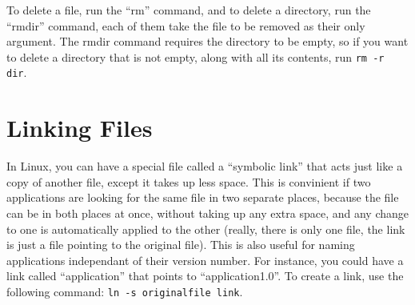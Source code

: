 \documentclass[12pt,letterpaper,oneside, openany]{book} \usepackage[latin1] {inputenc}
\begin{document}
To delete a file, run the ``rm'' command, and to delete a directory, run the ``rmdir'' command, each of them take the file to be removed as their only argument.  The rmdir command requires the directory to be empty, so if you want to delete a directory that is not empty, along with all its contents, run \verb+rm -r dir+.

\section{Linking Files}

In Linux, you can have a special file called a ``symbolic link'' that acts just like a copy of another file, except it takes up less space.  This is convinient if two applications are looking for the same file in two separate places, because the file can be in both places at once, without taking up any extra space, and any change to one is automatically applied to the other (really, there is only one file, the link is just a file pointing to the original file).  This is also useful for naming applications independant of their version number.  For instance, you could have a link called ``application'' that points to ``application1.0''.  To create a link, use the following command: \verb+ln -s originalfile link+.
\end{document}
